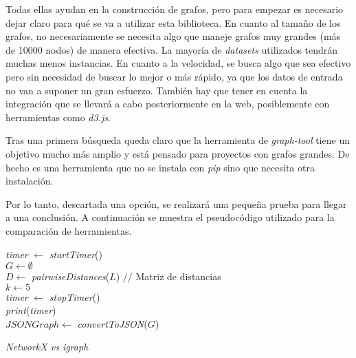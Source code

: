 Todas ellas ayudan en la construcción de grafos, pero para empezar es necesario dejar claro para qué se va a utilizar esta biblioteca. En cuanto al tamaño de los grafos, no necesariamente se necesita algo que maneje grafos muy grandes (más de 10000 nodos) de manera efectiva. La mayoría de \textit{datasets} utilizados tendrán muchas menos instancias. En cuanto a la velocidad, se busca algo que sea efectivo pero sin necesidad de buscar lo mejor o más rápido, ya que los datos de entrada no van a suponer un gran esfuerzo. También hay que tener en cuenta la integración que se llevará a cabo posteriormente en la web, posiblemente con herramientas como \textit{d3.js}.

Tras una primera búsqueda queda claro que la herramienta de \textit{graph-tool} tiene un objetivo mucho más amplio y está pensado para proyectos con grafos grandes. De hecho es una herramienta que no se instala con \textit{pip} sino que necesita otra instalación.

Por lo tanto, descartada una opción, se realizará una pequeña prueba para llegar a una conclusión. A continuación se muestra el pseudocódigo utilizado para la comparación de herramientas.

\begin{algorithm}
	\label{testGraph}
	\BlankLine
	\textit{timer} $\leftarrow$ \textit{startTimer}()\\
	$G \leftarrow \emptyset$\\
	$D \leftarrow$ \textit{pairwiseDistances}($L$) // Matriz de distancias\\
	$k \leftarrow 5$\\
	\textit{timer} $\leftarrow$ \textit{stopTimer}()\\
	\textit{print}(\textit{timer})\\
	$JSONGraph \leftarrow$ \textit{convertToJSON}($G$)\\
	\caption{\textit{NetworkX vs igraph}}
\end{algorithm}

